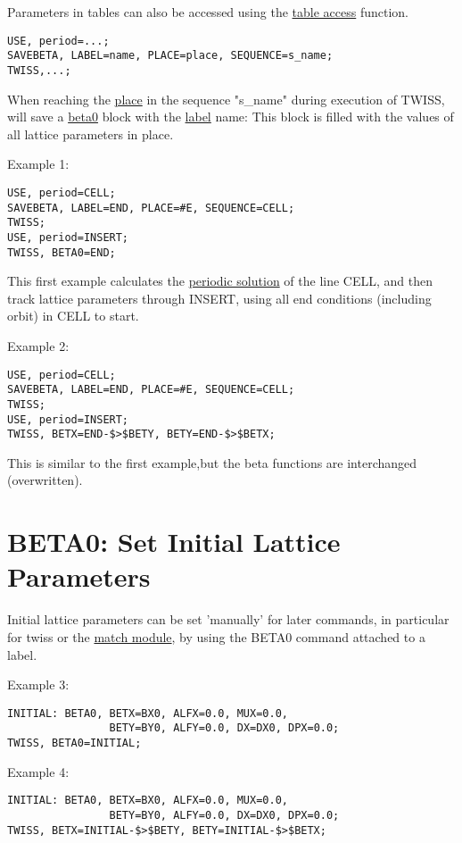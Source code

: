 Parameters in tables can also be accessed 
using the \href{../Introduction/expression.html#table}{table access}
function. 
\begin{verbatim}
USE, period=...;
SAVEBETA, LABEL=name, PLACE=place, SEQUENCE=s_name;
TWISS,...;
\end{verbatim}

When reaching the \href{../control/general.html#place}{place} in the
sequence "s\_name" during execution of TWISS, \madx will save a
\hyperlink{beta0}{beta0} block with the
\href{../Introduction/label.html}{label} name: This block is filled with
the values of all lattice parameters in place.  

Example 1: 
\begin{verbatim}
USE, period=CELL;
SAVEBETA, LABEL=END, PLACE=#E, SEQUENCE=CELL;
TWISS;
USE, period=INSERT;
TWISS, BETA0=END;
\end{verbatim}
This first example calculates the \hyperlink{periodic}{periodic
  solution} of the line CELL, and then track lattice parameters through
INSERT, using all end conditions (including orbit) in CELL to start.  

Example 2: 
\begin{verbatim}
USE, period=CELL;
SAVEBETA, LABEL=END, PLACE=#E, SEQUENCE=CELL;
TWISS;
USE, period=INSERT;
TWISS, BETX=END-$>$BETY, BETY=END-$>$BETX;
\end{verbatim}
This is similar to the first example,but the beta functions are interchanged (overwritten).  

\section{BETA0: Set Initial Lattice Parameters}

Initial lattice parameters can be set 'manually' for later commands, in
particular for twiss or the \href{../match/match.html}{match module}, by
using the BETA0 command attached to a label.  

Example 3: 
\begin{verbatim}
INITIAL: BETA0, BETX=BX0, ALFX=0.0, MUX=0.0, 
                BETY=BY0, ALFY=0.0, DX=DX0, DPX=0.0;
TWISS, BETA0=INITIAL;
\end{verbatim}

Example 4: 
\begin{verbatim}
INITIAL: BETA0, BETX=BX0, ALFX=0.0, MUX=0.0, 
                BETY=BY0, ALFY=0.0, DX=DX0, DPX=0.0;
TWISS, BETX=INITIAL-$>$BETY, BETY=INITIAL-$>$BETX;
\end{verbatim}



